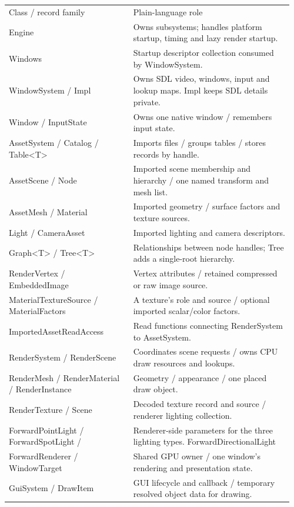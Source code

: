 \documentclass[11pt,a4paper]{article}
\begin{document}
{\small
\begin{longtable}{@{}p{0.42\linewidth}p{0.54\linewidth}@{}}
Class / record family & Plain-language role \\
Engine & Owns subsystems; handles platform startup, timing and lazy render startup. \\
Windows & Startup descriptor collection consumed by WindowSystem. \\
WindowSystem / Impl & Owns SDL video, windows, input and lookup maps. Impl keeps SDL details private. \\
Window / InputState & Owns one native window / remembers input state. \\
AssetSystem / Catalog / Table<T> & Imports files / groups tables / stores records by handle. \\
AssetScene / Node & Imported scene membership and hierarchy / one named transform and mesh list. \\
AssetMesh / Material & Imported geometry / surface factors and texture sources. \\
Light / CameraAsset & Imported lighting and camera descriptors. \\
Graph<T> / Tree<T> & Relationships between node handles; Tree adds a single-root hierarchy. \\
RenderVertex / EmbeddedImage & Vertex attributes / retained compressed or raw image source. \\
MaterialTextureSource / MaterialFactors & A texture's role and source / optional imported scalar/color factors. \\
ImportedAssetReadAccess & Read functions connecting RenderSystem to AssetSystem. \\
RenderSystem / RenderScene & Coordinates scene requests / owns CPU draw resources and lookups. \\
RenderMesh / RenderMaterial / RenderInstance & Geometry / appearance / one placed draw object. \\
RenderTexture / Scene & Decoded texture record and source / renderer lighting collection. \\
ForwardPointLight / ForwardSpotLight / & Renderer-side parameters for the three lighting types. ForwardDirectionalLight \\
ForwardRenderer / WindowTarget & Shared GPU owner / one window's rendering and presentation state. \\
GuiSystem / DrawItem & GUI lifecycle and callback / temporary resolved object data for drawing. \\
\end{longtable}
}
\end{document}
